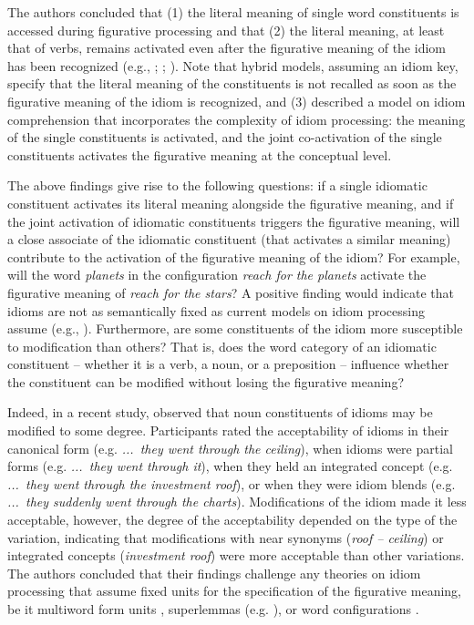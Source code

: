 \documentclass[output=paper]{langsci/langscibook}
\begin{document}
The authors concluded that (1) the literal meaning of single word constituents is accessed during figurative processing and that (2) the literal meaning, at least that of verbs, remains activated even after the figurative meaning of the idiom has been recognized (e.g., \citealt{cacciari:1988}; \citealt{cutting:1997}; \citealt{sprenger:2006}). Note that hybrid models, assuming an idiom key, specify that the literal meaning of the constituents is not recalled as soon as the figurative meaning of the idiom is recognized, and (3) described a model on idiom comprehension that incorporates the complexity of idiom processing: the meaning of the single constituents is activated, and the joint co-activation of the single constituents activates the figurative meaning at the conceptual level.

The above findings give rise to the following questions: if a single idiomatic constituent activates its literal meaning alongside the figurative meaning, and if the joint activation of idiomatic constituents triggers the figurative meaning, will a close associate of the idiomatic constituent (that activates a similar meaning) contribute to the activation of the figurative meaning of the idiom? For example, will the word \textit{planets} in the configuration \textit{reach for the planets} activate the figurative meaning of \textit{reach for the stars}? A positive finding would indicate that idioms are not as semantically fixed as current models on idiom processing assume (e.g., \citealt{sprenger:2006}). Furthermore, are some constituents of the idiom more susceptible to modification than others? That is, does the word category of an idiomatic constituent -- whether it is a verb, a noun, or a preposition -- influence whether the constituent can be modified without losing the figurative meaning?

Indeed, in a recent study, \citet{geeraert:2017} observed that noun constituents of idioms may be modified to some degree. Participants rated the acceptability of idioms in their canonical form (e.g. \textit{...~they went through the ceiling}), when idioms were partial forms (e.g. \textit{...~they went through it}), when they held an integrated concept (e.g. \textit{...~they went through the investment roof}), or when they were idiom blends (e.g. \textit{...~they suddenly went through the charts}). Modifications of the idiom made it less acceptable, however, the degree of the acceptability depended on the type of the variation, indicating that modifications with near synonyms (\textit{roof – ceiling}) or integrated concepts (\textit{investment roof}) were more acceptable than other variations. The authors concluded that their findings challenge any theories on idiom processing that assume fixed units for the specification of the figurative meaning, be it multiword form units \citep{bobrow:1973}, superlemmas (e.g. \citealt{sprenger:2006}), or word configurations \citep{cacciari:1988}. 
\end{document}

